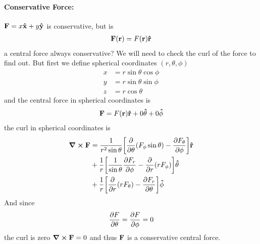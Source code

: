 \documentclass[../main.tex]{subfiles}
\begin{document}
\paragraph{Conservative Force:} \( \vb{F} = x \vu{x} + y \vu{y} \) is conservative, but is
\begin{align*}
    \vb{F}(\vb{r}) = F(\vb{r}) \vu{r} 
\end{align*} 
a central force always conservative? We will need to check the curl of the force to find out. But
first we define spherical coordinates $(r, \theta, \phi)$
\begin{align*}
    x &= r \sin\theta \cos\phi \\
    y &= r \sin\theta \sin\phi \\
    z &= r \cos\theta
\end{align*}
and the central force in spherical coordinates is
\begin{align*}
    \vb{F} = F(\vb{r}) \vu{r} + 0 \vu{\theta} + 0 \vu{\phi}
\end{align*}
the curl in spherical coordinates is
\begin{align*}
    \curl \vb{F} &= \frac{1}{r^2 \sin\theta} \qt[\pdv{\theta} (F_\phi \sin\theta) - \pdv{F_\theta}{\phi}] \vu{r}\\
    &+ \frac{1}{r} \qt[\frac{1}{\sin\theta} \pdv{F_r}{\phi} - \pdv{r} (r F_\phi)] \vu{\theta} \\
    &+ \frac{1}{r} \qt[\pdv{r} (r F_\theta) - \pdv{F_r}{\theta}] \vu{\phi}
\end{align*}
And since
\begin{align*}
    \pdv{F}{\theta} = \pdv{F}{\phi} = 0
\end{align*}
the curl is zero $\curl \vb{F} = 0$ and thus $\vb{F}$ is a conservative central force.
\end{document}
